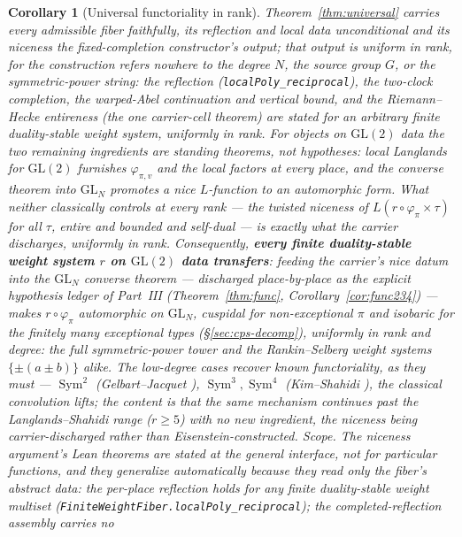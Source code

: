\documentclass[11pt]{article}
\newtheorem{corollary}[theorem]{Corollary}
\theoremstyle{definition}
\newcommand{\Sym}{\operatorname{Sym}}
\begin{document}
\begin{corollary}[Universal functoriality in rank]\label{cor:universal}
Theorem~\ref{thm:universal} carries every admissible fiber faithfully, its reflection and local data
unconditional and its niceness the fixed-completion constructor's output; that output is uniform in rank, for the
construction refers nowhere to the degree $N$, the source group $G$, or the symmetric-power string: the
reflection (\texttt{localPoly\_reciprocal}), the two-clock completion, the warped-Abel continuation and vertical
bound, and the Riemann--Hecke entireness (the one carrier-cell theorem) are stated for an \emph{arbitrary} finite
duality-stable weight system, \emph{uniformly in rank}. For objects on $\mathrm{GL}(2)$ data the two remaining
ingredients are standing theorems, not hypotheses: local Langlands for $\mathrm{GL}(2)$ furnishes
$\varphi_{\pi,v}$ and the local factors at every place, and the converse theorem into $\mathrm{GL}_N$ \cite{CPS}
promotes a nice $L$-function to an automorphic form. What neither classically controls at every rank --- the
twisted niceness of $L(r\circ\varphi_\pi\times\tau)$ for all $\tau$, entire and bounded and self-dual --- is
exactly what the carrier discharges, uniformly in rank. Consequently, \textbf{every finite duality-stable weight
system $r$ on $\mathrm{GL}(2)$ data transfers}: feeding the carrier's nice datum into the $\mathrm{GL}_N$ converse
theorem --- discharged place-by-place as the explicit hypothesis ledger of Part~III (Theorem~\ref{thm:func},
Corollary~\ref{cor:func234}) --- makes $r\circ\varphi_\pi$ automorphic on $\mathrm{GL}_N$, cuspidal for
non-exceptional $\pi$ and isobaric for the finitely many exceptional types (\S\ref{sec:cps-decomp}), uniformly in
rank and degree: the full symmetric-power tower and the Rankin--Selberg weight systems $\{\pm(a\pm b)\}$ alike. The low-degree cases recover known functoriality, as they
must --- $\Sym^2$ (Gelbart--Jacquet \cite{GJ}), $\Sym^3,\Sym^4$ (Kim--Shahidi \cite{KimShahidi}), the classical
convolution lifts; the content is that the \emph{same} mechanism continues past the Langlands--Shahidi range
($r\ge5$) with no new ingredient, the niceness being carrier-discharged rather than Eisenstein-constructed.
\emph{Scope.} The niceness argument's Lean theorems are stated at the general interface, not for
particular functions, and they generalize automatically because they read only the fiber's abstract
data: the per-place reflection holds for \emph{any} finite duality-stable weight multiset
(\texttt{FiniteWeightFiber.localPoly\_reciprocal}); the completed-reflection assembly carries \emph{no}

\end{corollary}
\end{document}
